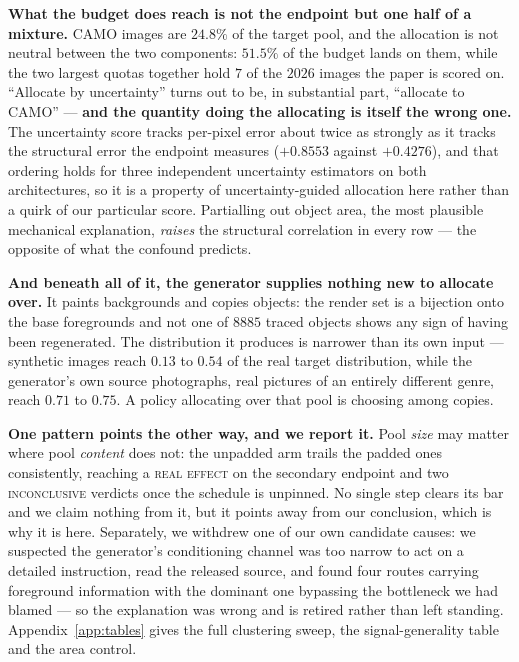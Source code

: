 \documentclass{article} %
\begin{document}
\textbf{What the budget does reach is not the endpoint but one half of a mixture.} CAMO images are
$24.8\%$ of the target pool, and the allocation is not neutral between the two components: $51.5\%$
of the budget lands on them, while the two largest quotas together hold $7$ of the $2026$ images the
paper is scored on. ``Allocate by uncertainty'' turns out to be, in substantial part, ``allocate
to CAMO'' --- \textbf{and the quantity doing the allocating is itself the wrong one.} The
uncertainty score tracks per-pixel error about twice as strongly as it tracks the structural error
the endpoint measures ($+0.8553$ against $+0.4276$), and that ordering holds for three independent
uncertainty estimators on both architectures, so it is a property of uncertainty-guided allocation
here rather than a quirk of our particular score. Partialling out object area, the most plausible
mechanical explanation, \emph{raises} the structural correlation in every row --- the opposite of
what the confound predicts.

\textbf{And beneath all of it, the generator supplies nothing new to allocate over.} It paints
backgrounds and copies objects: the render set is a bijection onto the base foregrounds and not one
of $8885$ traced objects shows any sign of having been regenerated. The distribution it produces is
narrower than its own input --- synthetic images reach $0.13$ to $0.54$ of the real target
distribution, while the generator's own source photographs, real pictures of an entirely different
genre, reach $0.71$ to $0.75$. A policy allocating over that pool is choosing among copies.

\textbf{One pattern points the other way, and we report it.} Pool \emph{size} may matter where pool
\emph{content} does not: the unpadded arm trails the padded ones consistently, reaching a
\textsc{real effect} on the secondary endpoint and two \textsc{inconclusive} verdicts once the
schedule is unpinned. No single step clears its bar and we claim nothing from it, but it points away
from our conclusion, which is why it is here. Separately, we withdrew one of our own candidate
causes: we suspected the generator's conditioning channel was too narrow to act on a detailed
instruction, read the released source, and found four routes carrying foreground information with
the dominant one bypassing the bottleneck we had blamed --- so the explanation was wrong and is
retired rather than left standing. Appendix~\ref{app:tables} gives the full clustering sweep, the
signal-generality table and the area control.
\end{document}
